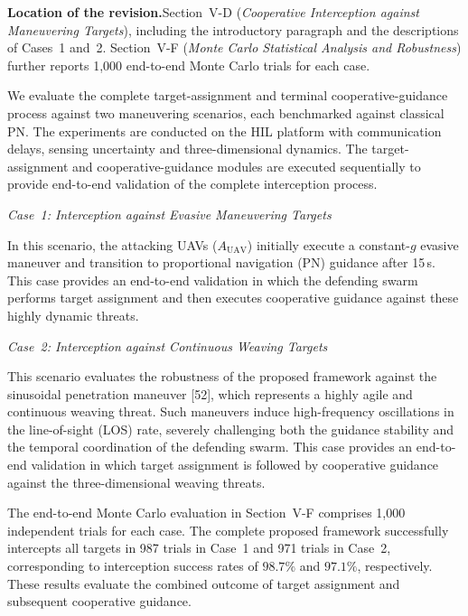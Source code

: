 \documentclass[11pt]{article}
\newcommand{\hladd}[1]{{\color{addblue}#1}}
\newcommand{\loc}{\medskip\noindent\textbf{Location of the revision.}\quad}
\begin{document}
\loc Section~V-D (\emph{Cooperative Interception against Maneuvering
Targets}), including the introductory paragraph and the descriptions of
Cases~1 and~2. Section~V-F (\emph{Monte Carlo Statistical Analysis and
Robustness}) further reports 1,000 end-to-end Monte Carlo trials for each
case.

\begin{tcolorbox}[enhanced,breakable,colback=white,colframe=addblue!55,
coltext=addblue,fontupper=\color{addblue},boxrule=0.6pt,arc=2pt,
left=9pt,right=9pt,top=7pt,bottom=7pt]
\hladd{We evaluate the complete target-assignment and terminal
cooperative-guidance process} against two maneuvering scenarios, each
benchmarked against classical PN.
\hladd{The experiments are conducted on the HIL platform with communication
delays, sensing uncertainty and three-dimensional dynamics. The
target-assignment and cooperative-guidance modules are executed sequentially
to provide end-to-end validation of the complete interception process.}

\medskip
\noindent\emph{Case~1: Interception against Evasive Maneuvering Targets}

In this scenario, the attacking UAVs ($A_{\mathrm{UAV}}$) initially execute
a constant-$g$ evasive maneuver and transition to proportional navigation
(PN) guidance after 15\,s.
\hladd{This case provides an end-to-end validation in which the defending
swarm performs target assignment and then executes cooperative guidance
against these highly dynamic threats.}

\medskip
\noindent\emph{Case~2: Interception against Continuous Weaving Targets}

This scenario evaluates the robustness of the proposed framework against the
sinusoidal penetration maneuver [52], which represents a
highly agile and continuous weaving threat. Such maneuvers induce
high-frequency oscillations in the line-of-sight (LOS) rate, severely
challenging both the guidance stability and the temporal coordination of the
defending swarm.
\hladd{This case provides an end-to-end validation in which target assignment
is followed by cooperative guidance against the three-dimensional weaving
threats.}
\end{tcolorbox}

\noindent The end-to-end Monte Carlo evaluation in Section~V-F comprises
1,000 independent trials for each case. The complete proposed framework
successfully intercepts all targets in 987 trials in Case~1 and 971 trials
in Case~2, corresponding to interception success rates of $98.7\%$ and
$97.1\%$, respectively. These results evaluate the combined outcome of
target assignment and subsequent cooperative guidance.
\end{document}
